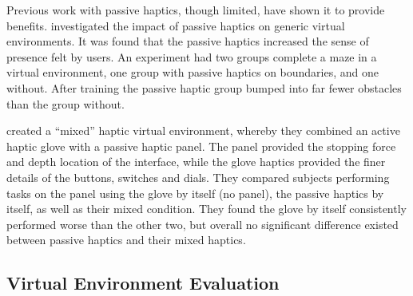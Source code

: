 Previous work with passive haptics, though limited, have shown it to provide benefits.
\citet{insko_passive_2001} investigated the impact of passive haptics on generic virtual environments.
It was found that the passive haptics increased the sense of presence felt by users.
An experiment had two groups complete a maze in a virtual environment, one group with passive haptics on boundaries, and one without.
After training the passive haptic group bumped into far fewer obstacles than the group without.

\citet{borst_evaluation_2005} created a ``mixed'' haptic virtual environment, whereby they combined an active haptic glove with a passive haptic panel.
The panel provided the stopping force and depth location of the interface, while the glove haptics provided the finer details of the buttons, switches and dials.
They compared subjects performing tasks on the panel using the glove by itself (no panel), the passive haptics by itself, as well as their mixed condition.
They found the glove by itself consistently performed worse than the other two, but overall no significant difference existed between passive haptics and their mixed haptics.

\subsection{Virtual Environment Evaluation}
\label{virtual-environment-evaluation}


